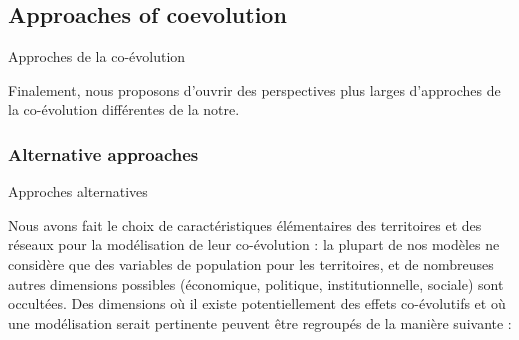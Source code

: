 \subsection{Approaches of coevolution}{Approches de la co-évolution}

Finalement, nous proposons d'ouvrir des perspectives plus larges d'approches de la co-évolution différentes de la notre.


\subsubsection{Alternative approaches}{Approches alternatives}


Nous avons fait le choix de caractéristiques élémentaires des territoires et des réseaux pour la modélisation de leur co-évolution : la plupart de nos modèles ne considère que des variables de population pour les territoires, et de nombreuses autres dimensions possibles (économique, politique, institutionnelle, sociale) sont occultées. Des dimensions où il existe potentiellement des effets co-évolutifs et où une modélisation serait pertinente peuvent être regroupés de la manière suivante :
